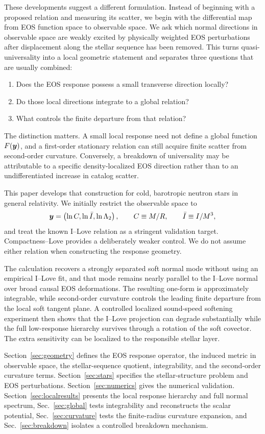These developments suggest a different formulation. Instead of beginning with a proposed relation and measuring its scatter, we begin with the differential map from EOS function space to observable space. We ask which normal directions in observable space are weakly excited by physically weighted EOS perturbations after displacement along the stellar sequence has been removed. This turns quasi-universality into a local geometric statement and separates three questions that are usually combined:
\begin{enumerate}
    \item Does the EOS response possess a small transverse direction locally?
    \item Do those local directions integrate to a global relation?
    \item What controls the finite departure from that relation?
\end{enumerate}

The distinction matters. A small local response need not define a global function \(F(\bm{y})\), and a first-order stationary relation can still acquire finite scatter from second-order curvature. Conversely, a breakdown of universality may be attributable to a specific density-localized EOS direction rather than to an undifferentiated increase in catalog scatter.

This paper develops that construction for cold, barotropic neutron stars in general relativity. We initially restrict the observable space to
\begin{equation}
    \bm{y} =
    \left(\ln C,\ln\bar I,\ln\Lambda_2\right),
    \qquad
    C\equiv M/R,\qquad
    \bar I\equiv I/M^3,
\end{equation}
and treat the known I--Love relation as a stringent validation target. Compactness--Love provides a deliberately weaker control. We do not assume either relation when constructing the response geometry.

The calculation recovers a strongly separated soft normal mode without using an empirical I--Love fit, and that mode remains nearly parallel to the I--Love normal over broad causal EOS deformations.  The resulting one-form is approximately integrable, while second-order curvature controls the leading finite departure from the local soft tangent plane.  A controlled localized sound-speed softening experiment then shows that the I--Love projection can degrade substantially while the full low-response hierarchy survives through a rotation of the soft covector.  The extra sensitivity can be localized to the responsible stellar layer.

Section~\ref{sec:geometry} defines the EOS response operator, the induced metric in observable space, the stellar-sequence quotient, integrability, and the second-order curvature terms. Section~\ref{sec:stars} specifies the stellar-structure problem and EOS perturbations. Section~\ref{sec:numerics} gives the numerical validation. Section~\ref{sec:localresults} presents the local response hierarchy and full normal spectrum, Sec.~\ref{sec:global} tests integrability and reconstructs the scalar potential, Sec.~\ref{sec:curvature} tests the finite-radius curvature expansion, and Sec.~\ref{sec:breakdown} isolates a controlled breakdown mechanism.
